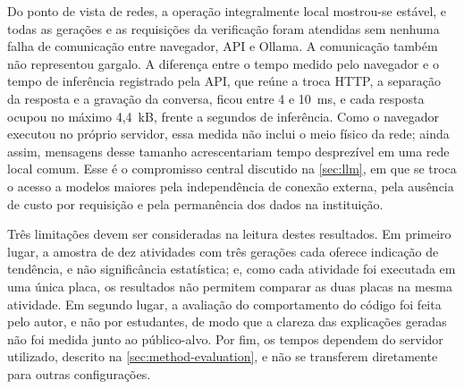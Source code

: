 Do ponto de vista de redes, a operação integralmente local mostrou-se estável, e todas as gerações e as requisições da verificação foram atendidas sem nenhuma falha de comunicação entre navegador, API e Ollama. A comunicação também não representou gargalo. A diferença entre o tempo medido pelo navegador e o tempo de inferência registrado pela API, que reúne a troca HTTP, a separação da resposta e a gravação da conversa, ficou entre 4 e 10~ms, e cada resposta ocupou no máximo 4,4~kB, frente a segundos de inferência. Como o navegador executou no próprio servidor, essa medida não inclui o meio físico da rede; ainda assim, mensagens desse tamanho acrescentariam tempo desprezível em uma rede local comum. Esse é o compromisso central discutido na \autoref{sec:llm}, em que se troca o acesso a modelos maiores pela independência de conexão externa, pela ausência de custo por requisição e pela permanência dos dados na instituição.

Três limitações devem ser consideradas na leitura destes resultados. Em primeiro lugar, a amostra de dez atividades com três gerações cada oferece indicação de tendência, e não significância estatística; e, como cada atividade foi executada em uma única placa, os resultados não permitem comparar as duas placas na mesma atividade. Em segundo lugar, a avaliação do comportamento do código foi feita pelo autor, e não por estudantes, de modo que a clareza das explicações geradas não foi medida junto ao público-alvo. Por fim, os tempos dependem do servidor utilizado, descrito na \autoref{sec:method-evaluation}, e não se transferem diretamente para outras configurações.
